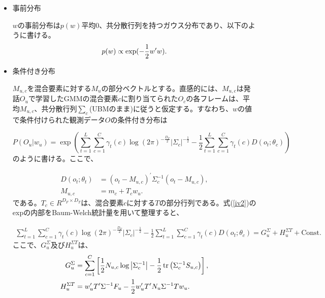 \begin{itemize}
\item 事前分布\par
$w$の事前分布は$p(w)$平均0、共分散行列を持つガウス分布であり、以下のように書ける。
\begin{equation}
p(w)\propto \exp(-\frac{1}{2}w^{\prime}w). \notag
\end{equation}

\item 条件付き分布\par
$M_{u,c}$を混合要素に対する$M_u$の部分ベクトルとする。直感的には、$M_{u,c}$は発話$O_u$で学習したGMMの混合要素$c$に割り当てられた$O_c$の各フレームは、平均$M_{u,c}$、共分散行列$\sum_{c}$(UBMのまま)に従うと仮定する。すなわち、$w$の値で条件付けられた観測データ$O$の条件付き分布は

\begin{equation}
\label{iv2}
P(O_u|w_u)=\exp\left(\sum_{t=1}^{L}\sum_{c=1}^{C}\gamma_t(c)\log(2\pi )^{-\frac{D_F}{2}}\left|\Sigma_{c}\right|^{-\frac{1}{2}}-\frac{1}{2}\sum_{t=1}^{L}\sum_{c=1}^{C}\gamma_t(c)D(o_t;\theta_c) \right)
\end{equation}
のように書ける。ここで、

\begin{align}
D(o_t;\theta_t) &=(o_t-M_{u,c})^\prime \Sigma_{c}^{-1}(o_t-M_{u,c}), \\
M_{u,c} &=m_c+T_cw_u.
\end{align}
である。$T_c\in R^{D_F\times D_T}$は、混合要素$c$に対する$T$の部分行列である。式(\ref{iv2})のexpの内部をBaum-Welch統計量を用いて整理すると、

\begin{equation}
\begin{split}
\sum_{t=1}^{L}\sum_{c=1}^{C}\gamma_t(c)\log(2\pi )^{-\frac{D_F}{2}}\left|\Sigma_{c}\right|^{-\frac{1}{2}}-\frac{1}{2}\sum_{t=1}^{L}\sum_{c=1}^{C}\gamma_t(c)D(o_t;\theta_c)=G_u^\Sigma+H_u^{\Sigma T}+\text{Const.}
\end{split}
\end{equation}
ここで、$G_u^\Sigma$及び$H_u^{\Sigma T}$は、
\begin{align}
G_u^\Sigma &=\sum_{c=1}^C\left[\frac{1}{2}N_{u,c}\log\left|\Sigma_c^{-1}\right|-\frac{1}{2}\tr\left(\Sigma_c^{-1}S_{u,c}\right)\right], \\
H_u^{\Sigma T} &=w_u^\prime T^\prime \Sigma^{-1}F_u-\frac{1}{2}w_u^\prime T^\prime N_u\Sigma^{-1}Tw_u. \label{iv3}
\end{align}


\end{itemize}
